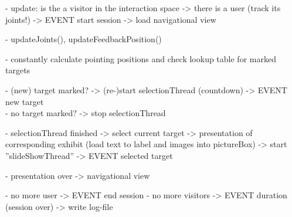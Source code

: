 - update: is the a visitor in the interaction space -> there is a user (track its joints!) -> EVENT start session -> load navigational view

- updateJoints(), updateFeedbackPosition()

- constantly calculate pointing positions and check lookup table for marked targets

- (new) target marked? -> (re-)start selectionThread (countdown) -> EVENT new target
\\
- no target marked? -> stop selectionThread

- selectionThread finished -> select current target -> presentation of corresponding exhibit (load text to label and images into pictureBox) -> start ''slideShowThread'' -> EVENT selected target

- presentation over -> navigational view

- no more user -> EVENT end session
- no more visitors -> EVENT duration (session over) -> write log-file

%


